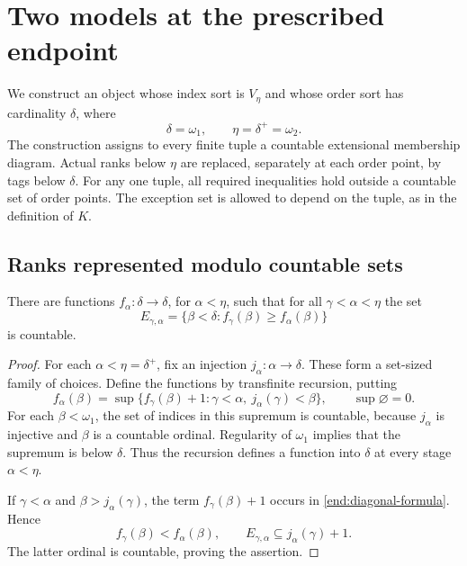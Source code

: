 \section{Two models at the prescribed endpoint}\label{sec:endpoint}

We construct an object whose index sort is \(V_\eta\) and whose order sort
has cardinality \(\delta\), where
\[
  \delta=\omega_1,\qquad \eta=\delta^+=\omega_2.
\]
The construction assigns to every finite tuple a countable extensional
membership diagram.  Actual ranks below \(\eta\) are replaced, separately
at each order point, by tags below \(\delta\).  For any one tuple, all
required inequalities hold outside a countable set of order points.
The exception set is allowed to depend on the tuple, as in the definition
of \(K\).

\subsection{Ranks represented modulo countable sets}

\begin{lemma}\label{end:domination}
There are functions \(f_\alpha:\delta\longrightarrow\delta\), for
\(\alpha<\eta\), such that for all \(\gamma<\alpha<\eta\) the set
\[
  E_{\gamma,\alpha}
  =\{\beta<\delta:f_\gamma(\beta)\geq f_\alpha(\beta)\}
\]
is countable.
\end{lemma}

\begin{proof}
For each \(\alpha<\eta=\delta^+\), fix an injection
\(j_\alpha:\alpha\longrightarrow\delta\).  These form a set-sized
family of choices.  Define the functions by transfinite recursion,
putting
\begin{equation}\label{end:diagonal-formula}
  f_\alpha(\beta)
  =
  \sup\{f_\gamma(\beta)+1:
        \gamma<\alpha,\ j_\alpha(\gamma)<\beta\},
  \qquad \sup\varnothing=0.
\end{equation}
For each \(\beta<\omega_1\), the set of indices in this supremum
is countable, because \(j_\alpha\) is injective and \(\beta\) is a
countable ordinal.  Regularity of \(\omega_1\) implies that the
supremum is below \(\delta\).  Thus the recursion defines a
function into \(\delta\) at every stage \(\alpha<\eta\).

If \(\gamma<\alpha\) and \(\beta>j_\alpha(\gamma)\), the term
\(f_\gamma(\beta)+1\) occurs in
\eqref{end:diagonal-formula}.  Hence
\[
  f_\gamma(\beta)<f_\alpha(\beta),
  \qquad
  E_{\gamma,\alpha}\subseteq j_\alpha(\gamma)+1.
\]
The latter ordinal is countable, proving the assertion.
\end{proof}

